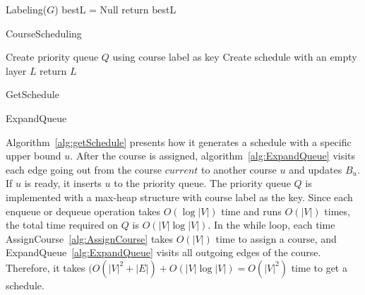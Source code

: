\documentclass[letterpaper,12pt]{article}
\theoremstyle{definition}
\begin{document}
\begin{algorithm}[H]
Labeling($G$)\;
bestL = Null\;
return bestL\;

\caption{CourseScheduling}\label{alg:coursescheduling}
\end{algorithm}
\bigskip
\begin{algorithm}[H]
Create priority queue $Q$ using course label as key\;
Create schedule with an empty layer $L$\;
return $L$\;
\caption{GetSchedule}\label{alg:getSchedule}
\end{algorithm}
\bigskip
\begin{algorithm}[H]
\caption{ExpandQueue}\label{alg:ExpandQueue}
\end{algorithm}



\bigskip

Algorithm~\ref{alg:getSchedule} presents how it generates a schedule with a specific upper bound $u$. After the course is assigned, algorithm~\ref{alg:ExpandQueue} visits each edge going out from the course $current$ to another course $u$ and updates $B_u$. If $u$ is ready, it inserts $u$ to the priority queue. The priority queue $Q$ is implemented with a max-heap structure with course label as the key. Since each enqueue or dequeue operation takes $O(\log |V|)$ time and runs $O(|V|)$ times, the total time required on $Q$ is $O(|V|\log|V|)$. In the while loop, each time AssignCourse~\ref{alg:AssignCourse} takes $O(|V|)$ time to assign a course, and ExpandQueue~\ref{alg:ExpandQueue} visits all outgoing edges of the course. Therefore, it takes $(O(|V|^2+|E|)+O(|V|\log|V|)=O(|V|^2)$ time to get a schedule. 
\end{document}
